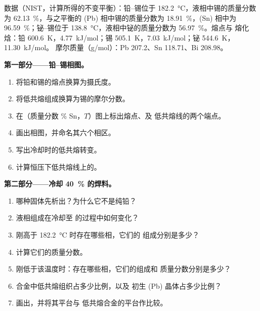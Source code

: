 \begin{problem}
\label{pb:b2:solid-liquid-diagrams:1}
数据（NIST，计算所得的不变平衡）：铅–锡位于
\qty{182.2}{\degreeCelsius}，液相中锡的质量分数为 62.13~\%，与之平衡的
(Pb) 相中锡的质量分数为 18.91~\%，(Sn) 相中为 96.59~\%；铋–锡位于
\qty{138.8}{\degreeCelsius}，液相中铋的质量分数为 56.97~\%。熔点与
熔化焓：铅 \qty{600.6}{K}，\qty{4.77}{kJ/mol}；锡
\qty{505.1}{K}，\qty{7.03}{kJ/mol}；铋 \qty{544.6}{K}，\qty{11.30}{kJ/mol}。
摩尔质量（\unit{g/mol}）：Pb 207.2、Sn 118.71、Bi 208.98。

\medskip
\noindent\textbf{第一部分——铅–锡相图。}
\begin{enumerate}
  \item 将铅和锡的熔点换算为摄氏度。
  \item 将低共熔组成换算为锡的摩尔分数。
  \item 在（质量分数 \% Sn，$T$）图上标出熔点、及
        低共熔线的两个端点。
  \item 画出相图，并命名其六个相区。
  \item 写出冷却时的低共熔转变。
  \item 计算恒压下低共熔线上的。
\end{enumerate}

\medskip
\noindent\textbf{第二部分——冷却 40~\% 的焊料。}
\begin{enumerate}[resume]
  \item 哪种固体先析出？为什么它不是纯铅？
  \item 液相组成在冷却至
        的过程中如何变化？
  \item 刚高于 \qty{182.2}{\degreeCelsius} 时存在哪些相，它们的
        组成分别是多少？
  \item 计算它们的质量分数。
  \item 刚低于该温度时：存在哪些相，它们的组成和
        质量分数分别是多少？
  \item 合金中低共熔组织占多少比例，以及
        初生 (Pb) 晶体占多少比例？
  \item 画出，并将其平台与
        低共熔合金的平台作比较。
\end{enumerate}


\end{problem}
